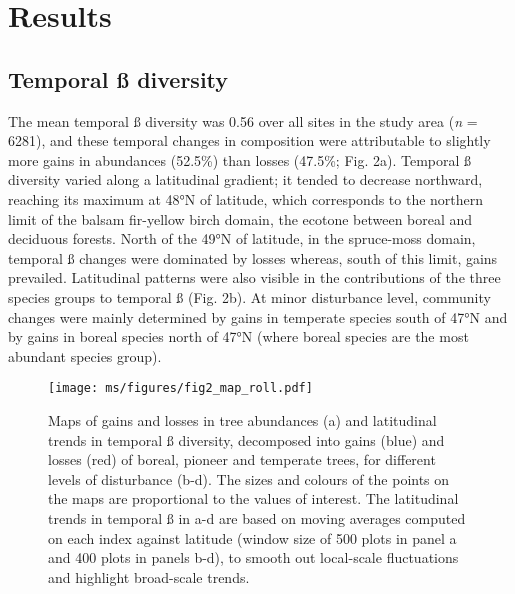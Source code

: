 \documentclass[
  a4paperpaper,
]{article}
\begin{document}
\hypertarget{results}{%
\section{Results}\label{results}}

\hypertarget{temporal-uxdf-diversity}{%
\subsection{Temporal ß diversity}\label{temporal-uxdf-diversity}}

The mean temporal ß diversity was 0.56 over all sites in the study area
(\emph{n} = 6281), and these temporal changes in composition were
attributable to slightly more gains in abundances (52.5\%) than losses
(47.5\%; Fig. 2a). Temporal ß diversity varied along a latitudinal
gradient; it tended to decrease northward, reaching its maximum at 48°N
of latitude, which corresponds to the northern limit of the balsam
fir-yellow birch domain, the ecotone between boreal and deciduous
forests. North of the 49°N of latitude, in the spruce-moss domain,
temporal ß changes were dominated by losses whereas, south of this
limit, gains prevailed. Latitudinal patterns were also visible in the
contributions of the three species groups to temporal ß (Fig. 2b). At
minor disturbance level, community changes were mainly determined by
gains in temperate species south of 47°N and by gains in boreal species
north of 47°N (where boreal species are the most abundant species
group).

\begin{figure}
\centering
\texttt{[image: ms/figures/fig2\_map\_roll.pdf]}
\caption{Maps of gains and losses in tree abundances (a) and latitudinal
trends in temporal ß diversity, decomposed into gains (blue) and losses
(red) of boreal, pioneer and temperate trees, for different levels of
disturbance (b-d). The sizes and colours of the points on the maps are
proportional to the values of interest. The latitudinal trends in
temporal ß in a-d are based on moving averages computed on each index
against latitude (window size of 500 plots in panel a and 400 plots in
panels b-d), to smooth out local-scale fluctuations and highlight
broad-scale trends.}
\end{figure}
\end{document}
